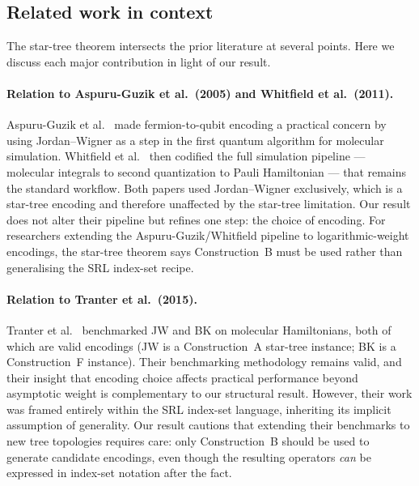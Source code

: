 \subsection{Related work in context}
\label{sec:related-context}

The star-tree theorem intersects the prior literature at several
points.  Here we discuss each major contribution in light of our
result.

\paragraph{Relation to Aspuru-Guzik et al.\ (2005) and Whitfield et al.\ (2011).}
Aspuru-Guzik et al.~\cite{aspuruguzik2005} made fermion-to-qubit
encoding a practical concern by using Jordan--Wigner as a step in the
first quantum algorithm for molecular simulation.  Whitfield et
al.~\cite{whitfield2011} then codified the full simulation pipeline
--- molecular integrals to second quantization to Pauli Hamiltonian
--- that remains the standard workflow.  Both papers used
Jordan--Wigner exclusively, which is a star-tree encoding and
therefore unaffected by the star-tree limitation.  Our result does not
alter their pipeline but refines one step: the choice of encoding.
For researchers extending the Aspuru-Guzik/Whitfield pipeline to
logarithmic-weight encodings, the star-tree theorem says
Construction~B must be used rather than generalising the SRL
index-set recipe.

\paragraph{Relation to Tranter et al.\ (2015).}
Tranter et al.~\cite{tranter2015} benchmarked JW and BK on
molecular Hamiltonians, both of which are valid encodings (JW is a
Construction~A star-tree instance; BK is a Construction~F instance).
Their benchmarking methodology remains valid, and their insight
that encoding choice affects practical performance beyond asymptotic
weight is complementary to our structural result.  However, their
work was framed entirely within the SRL index-set language, inheriting
its implicit assumption of generality.  Our result cautions that
extending their benchmarks to new tree topologies requires care:
only Construction~B should be used to generate candidate encodings,
even though the resulting operators \emph{can} be expressed in
index-set notation after the fact.

